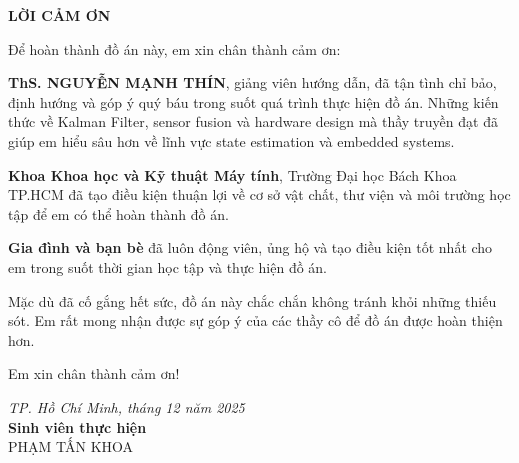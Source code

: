 \newpage
\thispagestyle{empty}
\begin{center}
{\LARGE \textbf{LỜI CẢM ƠN}}
\end{center}

\vspace{1cm}

Để hoàn thành đồ án này, em xin chân thành cảm ơn:

\textbf{ThS. NGUYỄN MẠNH THÍN}, giảng viên hướng dẫn, đã tận tình chỉ bảo, định hướng và góp ý quý báu trong suốt quá trình thực hiện đồ án. Những kiến thức về Kalman Filter, sensor fusion và hardware design mà thầy truyền đạt đã giúp em hiểu sâu hơn về lĩnh vực state estimation và embedded systems.

\textbf{Khoa Khoa học và Kỹ thuật Máy tính}, Trường Đại học Bách Khoa TP.HCM đã tạo điều kiện thuận lợi về cơ sở vật chất, thư viện và môi trường học tập để em có thể hoàn thành đồ án.

\textbf{Gia đình và bạn bè} đã luôn động viên, ủng hộ và tạo điều kiện tốt nhất cho em trong suốt thời gian học tập và thực hiện đồ án.

Mặc dù đã cố gắng hết sức, đồ án này chắc chắn không tránh khỏi những thiếu sót. Em rất mong nhận được sự góp ý của các thầy cô để đồ án được hoàn thiện hơn.

Em xin chân thành cảm ơn!

\vspace{2cm}

\begin{flushright}
\textit{TP. Hồ Chí Minh, tháng 12 năm 2025} \\
\vspace{0.5cm}
\textbf{Sinh viên thực hiện} \\
\vspace{1.5cm}
PHẠM TẤN KHOA
\end{flushright}
